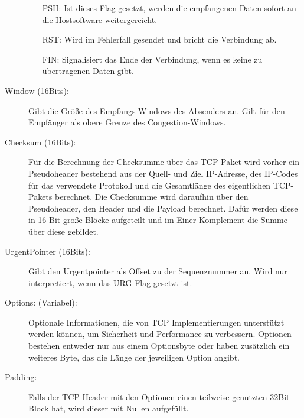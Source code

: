 \begin{description}
\begin{itemize}
\item[PSH: ] Ist dieses Flag gesetzt, werden die empfangenen Daten sofort an die Hostsoftware weitergereicht. 
\item[RST: ] Wird im Fehlerfall gesendet und bricht die Verbindung ab. 
\item[FIN: ] Signalisiert das Ende der Verbindung, wenn es keine zu übertragenen Daten gibt. 
\end{itemize}
\item[Window (16Bits): ] Gibt die Größe des Empfangs-Windows des Absenders an. Gilt für den Empfänger als obere Grenze des Congestion-Windows.
\item[Checksum (16Bits): ] Für die Berechnung der Checksumme über das TCP Paket wird vorher ein Pseudoheader bestehend aus der Quell- und Ziel IP-Adresse, des IP-Codes für das verwendete Protokoll und die Gesamtlänge des eigentlichen TCP-Pakets berechnet. Die Checksumme wird daraufhin über den Pseudoheader, den Header und die Payload berechnet. Dafür werden diese in 16 Bit große Blöcke aufgeteilt und im Einer-Komplement die Summe über diese gebildet. 
\item[UrgentPointer (16Bits): ] Gibt den Urgentpointer als Offset zu der Sequenznummer an. Wird nur interpretiert, wenn das URG Flag gesetzt ist.\
\item[Options: (Variabel): ]  Optionale Informationen, die von TCP Implementierungen unterstützt werden können, um Sicherheit und Performance zu verbessern. Optionen bestehen entweder nur aus einem Optionsbyte oder haben zusätzlich ein weiteres Byte, das die Länge der jeweiligen Option angibt. 
\item[Padding: ] Falls der TCP Header mit den Optionen einen teilweise genutzten 32Bit Block hat, wird dieser mit Nullen aufgefüllt. \cite{TCPr} 
\end{description}
